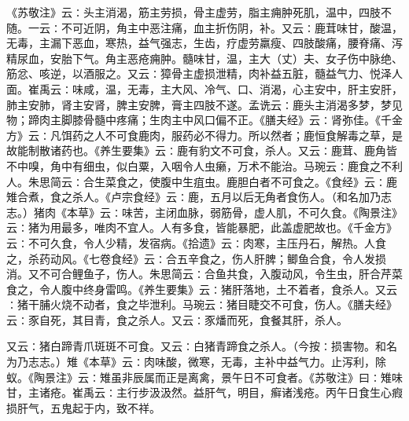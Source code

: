 \documentclass[a4paper,12pt,UTF8,twoside]{ctexbook}
\begin{document}
《苏敬注》云∶头主消渴，筋主劳损，骨主虚劳，脂主痈肿死肌，温中，四肢不随。一云∶不可近阴，角主中恶注痛，血主折伤阴，补。又云∶鹿茸味甘，酸温，无毒，主漏下恶血，寒热，益气强志，生齿，疗虚劳羸瘦、四肢酸痛，腰脊痛、泻精尿血，安胎下气。角主恶疮痈肿。髓味甘，温，主大（丈）夫、女子伤中脉绝、筋忿、咳逆，以酒服之。又云∶獐骨主虚损泄精，肉补益五脏，髓益气力、悦泽人面。崔禹云∶味咸，温，无毒，主大风、冷气、口、消渴，心主安中，肝主安肝，肺主安肺，肾主安肾，脾主安脾，膏主四肢不遂。孟诜云∶鹿头主消渴多梦，梦见物；蹄肉主脚膝骨髓中疼痛；生肉主中风口偏不正。《膳夫经》云∶肾弥佳。《千金方》云∶凡饵药之人不可食鹿肉，服药必不得力。所以然者；鹿恒食解毒之草，是故能制散诸药也。《养生要集》云∶鹿有豹文不可食，杀人。又云∶鹿茸、鹿角皆不中嗅，角中有细虫，似白粟，入咽令人虫癞，万术不能治。马琬云∶鹿食之不利人。朱思简云∶合生菜食之，使腹中生疽虫。鹿胆白者不可食之。《食经》云∶鹿雉合煮，食之杀人。《卢宗食经》云∶鹿，五月以后无角者食伤人。（和名加乃志志。）猪肉《本草》云∶味苦，主闭血脉，弱筋骨，虚人肌，不可久食。《陶景注》云∶猪为用最多，唯肉不宜人。人有多食，皆能暴肥，此盖虚肥故也。《千金方》云∶不可久食，令人少精，发宿病。《拾遗》云∶肉寒，主压丹石，解热。人食之，杀药动风。《七卷食经》云∶合五辛食之，伤人肝脾；鲫鱼合食，令人发损消。又不可合鲤鱼子，伤人。朱思简云∶合鱼共食，入腹动风，令生虫，肝合芹菜食之，令人腹中终身雷鸣。《养生要集》云∶猪肝落地，土不着者，食杀人。又云∶猪干脯火烧不动者，食之毕泄利。马琬云∶猪目睫交不可食，伤人。《膳夫经》云∶豕自死，其目青，食之杀人。又云∶豕燔而死，食餐其肝，杀人。

又云∶猪白蹄青爪斑斑不可食。又云∶白猪青蹄食之杀人。（今按∶损害物。和名为乃志志。）雉《本草》云∶肉味酸，微寒，无毒，主补中益气力。止泻利，除蚁。《陶景注》云∶雉虽非辰属而正是离禽，景午日不可食者。《苏敬注》曰∶雉味甘，主诸疮。崔禹云∶主行步汲汲然。益肝气，明目，癣诸浅疮。丙午日食生心瘕损肝气，五鬼起于内，致不祥。
\end{document}
